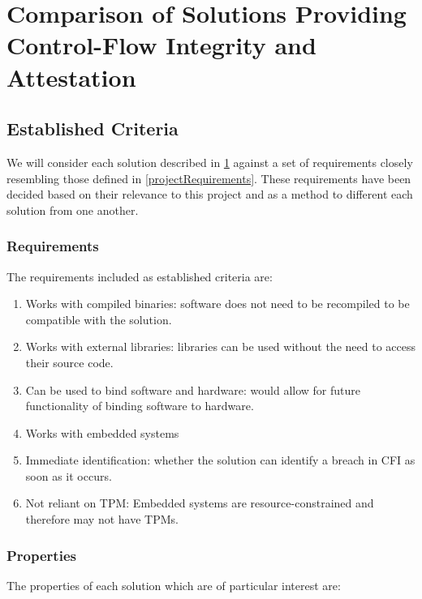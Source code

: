 \section{Comparison of Solutions Providing Control-Flow Integrity and Attestation} \label{comparisonOfCFISolutions}

\subsection{Established Criteria}\label{requirementsIntro}

We will consider each solution described in \ref{comparisonOfCFISolutions} against a set of requirements closely resembling those defined in \ref{projectRequirements}. These requirements have been decided based on their relevance to this project and as a method to different each solution from one another.

\subsubsection*{Requirements}\label{Requirements}

The requirements included as established criteria are:

\begin{enumerate}[label=(\arabic*),noitemsep]
	\item Works with compiled binaries: software does not need to be recompiled to be compatible with the solution.
	\item Works with external libraries: libraries can be used without the need to access their source code.
	\item Can be used to bind software and hardware: would allow for future functionality of binding software to hardware.
	\item Works with embedded systems
	\item Immediate identification: whether the solution can identify a breach in CFI as soon as it occurs.
	\item Not reliant on TPM: Embedded systems are resource-constrained and therefore may not have TPMs.
\end{enumerate}

\subsubsection*{Properties}\label{Properties}

The properties of each solution which are of particular interest are:

